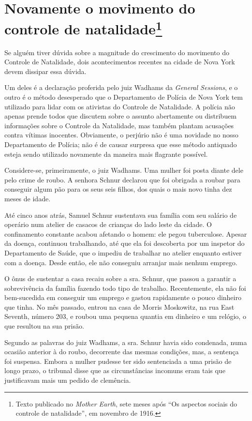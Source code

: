 \chapter[Novamente o movimento do controle de natalidade (1916)]{Novamente o movimento do controle de natalidade\footnote[*]{Texto publicado
  no \emph{Mother Earth}, sete meses após ``Os aspectos sociais do
  controle de natalidade'', em novembro de 1916.}}

Se alguém tiver dúvida sobre a magnitude do crescimento do movimento do
Controle de Natalidade, dois acontecimentos recentes na cidade de Nova
York devem dissipar essa dúvida.

Um deles é a declaração proferida pelo juiz Wadhams da \emph{General
Sessions}, e o outro é o método desesperado que o Departamento de
Polícia de Nova York tem utilizado para lidar com os ativistas do
Controle de Natalidade. A polícia não apenas prende todos que discutem
sobre o assunto abertamente ou distribuem informações sobre o Controle
da Natalidade, mas também plantam acusações contra vítimas inocentes.
Obviamente, o perjúrio não é uma novidade no nosso Departamento de
Polícia; não é de causar surpresa que esse método antiquado esteja sendo
utilizado novamente da maneira mais flagrante possível.

Considere-se, primeiramente, o juiz Wadhams. Uma mulher foi posta diante
dele pelo crime de roubo. A senhora Schnur declarou que foi obrigada a
roubar para conseguir algum pão para os seus seis filhos, dos quais o
mais novo tinha dez meses de idade.

Até cinco anos atrás, Samuel Schnur sustentava sua família com seu
salário de operário num atelier de casacos de crianças do lado leste da
cidade. O confinamento constante acabou afetando o homem: ele pegou
tuberculose. Apesar da doença, continuou trabalhando, até que ela foi
descoberta por um inspetor do Departamento de Saúde, que o impediu de
trabalhar no atelier enquanto estiver com a doença. Desde então, ele não
conseguiu arranjar mais nenhum emprego.

O ônus de sustentar a casa recaiu sobre a sra. Schnur, que passou a
garantir a sobrevivência da família fazendo todo tipo de trabalho.
Recentemente, ela não foi bem-sucedida em conseguir um emprego e gastou
rapidamente o pouco dinheiro que tinha. No mês passado, entrou na casa
de Morris Moskowitz, na rua East Seventh, número 203, e roubou uma
pequena quantia em dinheiro e um relógio, o que resultou na sua prisão.

Segundo as palavras do juiz Wadhams, a sra. Schnur havia sido condenada,
numa ocasião anterior à do roubo, decorrente das mesmas condições, mas,
a sentença foi suspensa. Embora a mulher pudesse ter sido sentenciada a
uma prisão de longo prazo, o tribunal disse que as circunstâncias
incomuns eram tais que justificavam mais um pedido de clemência.

